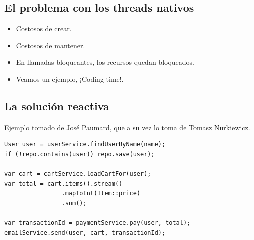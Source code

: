 \documentclass{presentacion}
\begin{document}
\subsection{El problema con los threads nativos}
\begin{frame}
 \begin{itemize}[<+->]
  \item Costosos de crear.
  \item Costosos de mantener.
  \item En llamadas bloqueantes, los recursos quedan bloqueados.
  \item Veamos un ejemplo, ¡Coding time!.
 \end{itemize}
\end{frame}

\subsection{La solución reactiva}

\begin{frame}[fragile]
Ejemplo tomado de José Paumard, que a su vez lo toma de Tomasz   Nurkiewicz. \cite{Java21VritualThreadsVideo}
    \begin{verbatim}
User user = userService.findUserByName(name);
if (!repo.contains(user)) repo.save(user);

var cart = cartService.loadCartFor(user);
var total = cart.items().stream()
                .mapToInt(Item::price)
                .sum();

var transactionId = paymentService.pay(user, total);
emailService.send(user, cart, transactionId);
     
    \end{verbatim}

\end{frame}
\end{document}
